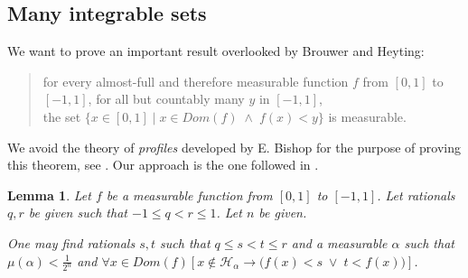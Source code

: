 \documentclass[a4paper]{amsart}
\theoremstyle{plain}
\newtheorem{lemma}[theorem]{Lemma}
\begin{document}
\subsection{Many integrable sets}\label{SS:manyintegrable}

We want to prove an important result overlooked by Brouwer and Heyting: \begin{quote}for every almost-full and therefore measurable function $f$  from $[0,1]$ to $[-1,1]$, for all but countably many $y$ in $[-1,1]$, \\the set $\{x\in [0,1] \mid x\in Dom(f)\;\wedge\;f(x) <y\}$ is measurable. \end{quote}We avoid the theory of \textit{profiles} developed by E. Bishop for the purpose of proving this theorem, see \cite[Chapter 6, Section 4 and Theorem 4.11]{bishopbridges85}. Our approach is the one followed in \cite{driessen}. 


\begin{lemma}\label{L:findingapproximateoriginal} Let $f$ be a measurable function from $[0,1]$ to $[-1,1]$. Let rationals $q,r$ be given such that $-1\le q < r\le 1$. Let $n$ be given.

One may find rationals $s,t$ such that $q\le s<t\le r$ and a measurable $\alpha$ such that $\mu(\alpha)<\frac{1}{2^n}$ and $\forall x\in Dom(f)[x\notin \mathcal{H}_\alpha\rightarrow \bigl(f(x)<s \;\vee\; t<f(x)\bigr)]$. \end{lemma}
\end{document}
